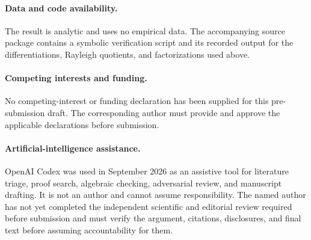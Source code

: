 \documentclass[11pt]{article}
\begin{document}
\paragraph{Data and code availability.}
The result is analytic and uses no empirical data.  The accompanying source
package contains a symbolic verification script and its recorded output for
the differentiations, Rayleigh quotients, and factorizations used above.

\paragraph{Competing interests and funding.}
No competing-interest or funding declaration has been supplied for this
pre-submission draft.  The corresponding author must provide and approve the
applicable declarations before submission.

\paragraph{Artificial-intelligence assistance.}
OpenAI Codex was used in September 2026 as an assistive tool for literature
triage, proof search, algebraic checking, adversarial review, and manuscript
drafting.  It is not an author and cannot assume responsibility.  The named
author has not yet completed the independent scientific and editorial review
required before submission and must verify the argument, citations,
disclosures, and final text before assuming accountability for them.



\end{document}
